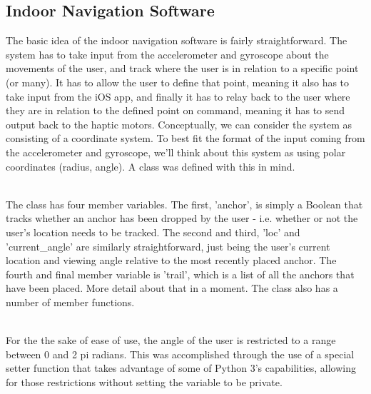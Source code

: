 \documentclass[letterpaper,12pt]{article}
\begin{document}
\subsection{Indoor Navigation Software}
The basic idea of the indoor navigation software is fairly straightforward. The system has to take input from the accelerometer and gyroscope about the movements of the user, and track where the user is in relation to a specific point (or many). It has to allow the user to define that point, meaning it also has to take input from the iOS app, and finally it has to relay back to the user where they are in relation to the defined point on command, meaning it has to send output back to the haptic motors. Conceptually, we can consider the system as consisting of a coordinate system. To best fit the format of the input coming from the accelerometer and gyroscope, we'll think about this system as using polar coordinates (radius, angle). A class was defined with this in mind. \newline \par

 \\

The class has four member variables. The first, 'anchor', is simply a Boolean that tracks whether an anchor has been dropped by the user - i.e. whether or not the user's location needs to be tracked. The second and third, 'loc' and 'current\_angle' are similarly straightforward, just being the user's current location and viewing angle relative to the most recently placed anchor. The fourth and final member variable is 'trail', which is a list of all the anchors that have been placed. More detail about that in a moment. The class also has a number of member functions. \newline \par

 \\

For the the sake of ease of use, the angle of the user is restricted to a range between 0 and 2 pi radians. This was accomplished through the use of a special setter function that takes advantage of some of Python 3's capabilities, allowing for those restrictions without setting the variable to be private. \newline \par
\end{document}
